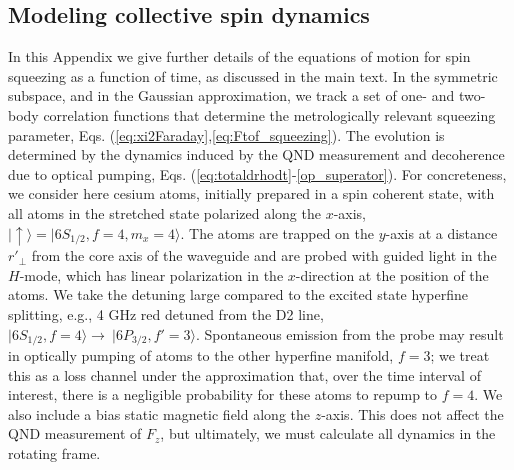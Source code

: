 \documentclass[preprint,aps,pra,onecolumn,superscriptaddress]{revtex4-1} %
\def\ket#1{\lvert{#1}\rangle}%
\begin{document}


\begin{appendix}
\section{Modeling collective spin dynamics}\label{Sec::opticalpumpinginrotatingframe}
In this Appendix we give further details of the equations of motion for spin squeezing as a function of time, as discussed in the main text.  In the symmetric subspace, and in the Gaussian approximation, we track a set of one- and two-body correlation functions that determine the metrologically relevant squeezing parameter, Eqs. (\ref{eq:xi2Faraday},\ref{eq:Ftof_squeezing}).   The evolution is determined by the dynamics induced by the QND measurement and decoherence due to optical pumping, Eqs. (\ref{eq:totaldrhodt}-\ref{op_superator}).   For concreteness, we consider here cesium atoms,  initially prepared in a spin coherent state, with all atoms in the stretched state polarized along the $x$-axis, $\ket{\uparrow} = \ket{6S_{1/2}, f=4, m_x=4}$.  The atoms are trapped on the $y$-axis at a distance $r'_\perp$ from the core axis of the waveguide and are probed with guided light in the $H$-mode, which has linear polarization in the $x$-direction at the position of the atoms.   We take the detuning large compared to the excited state hyperfine splitting, e.g., 4 GHz red detuned from the D2 line,  $\ket{6S_{1/2}, f=4}\rightarrow \ \ket{6P_{3/2},f'=3}$.   Spontaneous emission from the probe may result in optically pumping of atoms to the other  hyperfine manifold, $f=3$; we treat this as a loss channel under the approximation that, over the time interval of interest, there is a negligible probability for these atoms to repump to $f=4$.  We also include a bias static magnetic field along the $z$-axis.  This does not affect the QND measurement of $F_z$, but ultimately, we must  calculate all dynamics in the rotating frame.


\end{appendix}
\end{document}
